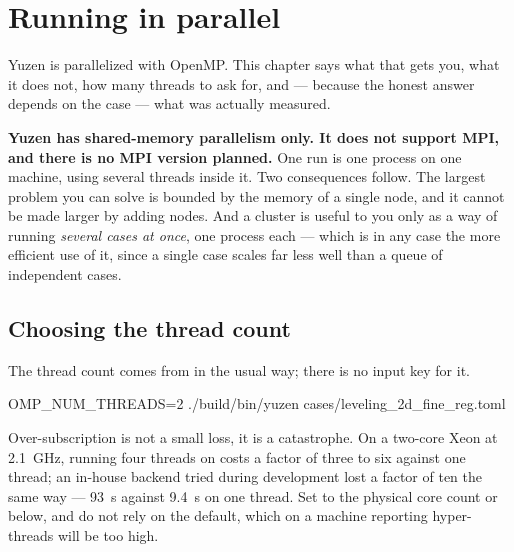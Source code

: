 \chapter{Running in parallel}
\label{ch:parallel}

Yuzen is parallelized with OpenMP. This chapter says what that gets you, what
it does not, how many threads to ask for, and --- because the honest answer
depends on the case --- what was actually measured.

\begin{warn}
  \textbf{Yuzen has shared-memory parallelism only. It does not support MPI,
  and there is no MPI version planned.} One run is one process on one machine,
  using several threads inside it. Two consequences follow. The largest problem
  you can solve is bounded by the memory of a single node, and it cannot be
  made larger by adding nodes. And a cluster is useful to you only as a way of
  running \emph{several cases at once}, one process each --- which is in any
  case the more efficient use of it, since a single case scales far less well
  than a queue of independent cases.
\end{warn}

\section{Choosing the thread count}
\label{sec:parallel:threads}

The thread count comes from  in the usual way; there is
no input key for it.

\begin{shell}
OMP_NUM_THREADS=2 ./build/bin/yuzen cases/leveling_2d_fine_reg.toml
\end{shell}

\begin{warn}
  Over-subscription is not a small loss, it is a catastrophe. On a two-core
  Xeon at \SI{2.1}{\giga\hertz}, running four threads on
   costs a factor of three to six against one thread; an
  in-house backend tried during development lost a factor of ten the same way ---
  \SI{93}{\second} against \SI{9.4}{\second} on one thread. Set
   to the physical core count or below, and do not rely
  on the default, which on a machine reporting hyper-threads will be too high.
\end{warn}

